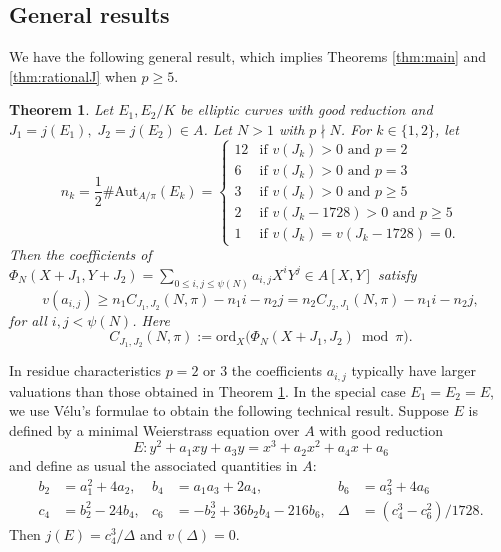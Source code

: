 \documentclass[11pt]{amsart}
\newtheorem{thm}[prop]{Theorem}
\theoremstyle{definition}
\newcommand{\Aut} {\mathrm{Aut}}
\newcommand{\ord}{\mathrm{ord}}
\begin{document}
\subsection{General results}\label{sec:setup}

We have the following general result, which implies Theorems \ref{thm:main} and \ref{thm:rationalJ} when $p\geq 5$.

\begin{thm}\label{thm:bigprimes}
    Let $E_1, E_2/K$ be elliptic curves with good reduction and $J_1 = j(E_1), \; J_2 = j(E_2)\in A$.
    Let $N > 1$ with $p\nmid N$. For $k\in\{1,2\}$, let 
    \[
    n_k = \frac{1}{2}\#\Aut_{A/\pi}(E_k) = \left\{
    \begin{array}{ll}
        12 & \text{if $v(J_k) > 0$ and $p=2$} \\
        6 & \text{if $v(J_k) > 0$ and $p=3$} \\
        3 & \text{if $v(J_k) > 0$ and $p\geq 5$} \\
        2 & \text{if $v(J_k - 1728) > 0$ and $p\geq 5$} \\
        1 & \text{if $v(J_k) = v(J_k-1728) = 0$.}
    \end{array}
    \right.
    \]
    Then the coefficients of $\Phi_N(X+J_1, Y+J_2) = \sum_{0\leq i,j \leq \psi(N)}a_{i,j}X^iY^j\in A[X,Y]$ satisfy
    \[
    v(a_{i,j}) \geq n_1 C_{J_1,J_2}(N,\pi)- n_1 i-n_2 j = n_2 C_{J_2,J_1}(N,\pi)- n_1 i-n_2 j,
    \]
    for all $i,j < \psi(N)$.
    Here 
    \[
    C_{J_1,J_2}(N,\pi) := \ord_{X}\big(\Phi_N(X+J_1, J_2) \bmod \pi\big).
    \]
\end{thm}

In residue characteristics $p=2$ or $3$ the coefficients $a_{i,j}$ typically have larger valuations than those obtained in Theorem \ref{thm:bigprimes}. In the special case $E_1=E_2 = E$, we use V\'elu's formulae to obtain the following technical result. 
Suppose $E$ is defined by a minimal Weierstrass equation over $A$ with good reduction
\begin{equation}\label{eq:WE}
E : y^2 + a_1xy + a_3y = x^3 + a_2x^2 + a_4x + a_6
\end{equation}
and define as usual the associated quantities in $A$:
\begin{align*}
    b_2 & = a_1^2+4a_2, & b_4 & = a_1a_3 + 2a_4, & b_6 & = a_3^2 + 4a_6 \\
    c_4 & = b_2^2 - 24b_4, & c_6 & = -b_2^3 + 36b_2b_4 - 216 b_6, 
    & \Delta & = (c_4^3-c_6^2)/1728.
\end{align*}
Then $j(E) = c_4^3/\Delta$ and $v(\Delta)=0$. 
\end{document}
